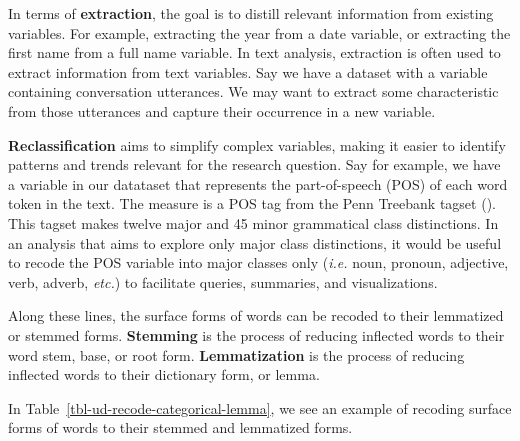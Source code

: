 \documentclass[
  letterpaper,
]{latex/krantz}
\theoremstyle{definition}
\theoremstyle{remark}
\begin{document}
In terms of \textbf{extraction}, the goal is to distill relevant
information from existing variables. For example, extracting the year
from a date variable, or extracting the first name from a full name
variable. In text analysis, extraction is often used to extract
information from text variables. Say we have a dataset with a variable
containing conversation utterances. We may want to extract some
characteristic from those utterances and capture their occurrence in a
new variable.

\textbf{Reclassification} aims to simplify complex variables, making it
easier to identify patterns and trends relevant for the research
question. Say for example, we have a variable in our datataset that
represents the part-of-speech (POS) of each word token in the text. The
measure is a POS tag from the Penn Treebank tagset
().
This tagset makes twelve major and 45 minor grammatical class
distinctions. In an analysis that aims to explore only major class
distinctions, it would be useful to recode the POS variable into major
classes only (\emph{i.e.} noun, pronoun, adjective, verb, adverb,
\emph{etc.}) to facilitate queries, summaries, and visualizations.

Along these lines, the surface forms of words can be recoded to their
lemmatized or stemmed forms. \textbf{Stemming} is the process of
reducing inflected words to their word stem, base, or root form.
\textbf{Lemmatization} is the process of reducing inflected words to
their dictionary form, or lemma.

In Table~\ref{tbl-ud-recode-categorical-lemma}, we see an example of
recoding surface forms of words to their stemmed and lemmatized forms.
\end{document}
